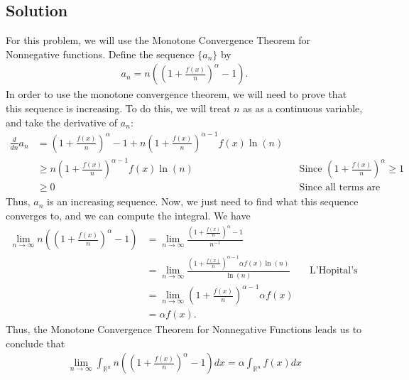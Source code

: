 \documentclass[10pt,a4paper]{article}
\theoremstyle{theorem}
\theoremstyle{definition}
\begin{document}
\subsection*{Solution}
For this problem, we will use the Monotone Convergence Theorem for Nonnegative functions. Define the sequence $\{a_n \}$ by
\begin{align*}
a_n = n \left( \left( 1 + \frac{f(x)}{n} \right)^ \alpha - 1 \right).
\end{align*}
In order to use the monotone convergence theorem, we will need to prove that this sequence is increasing. To do this, we will treat $n$ as as a continuous variable, and take the derivative of $a_n$:
\begin{align*}
\frac{d}{dn}a_n &= \left( 1 + \frac{f(x)}{n} \right)^ \alpha - 1 + n\left( 1 + \frac{f(x)}{n} \right)^ {\alpha - 1} f(x) \ln(n)\\
&\geq n\left( 1 + \frac{f(x)}{n} \right)^ {\alpha - 1} f(x) \ln(n) && \text{Since } \left( 1 + \frac{f(x)}{n} \right)^ \alpha \geq 1\\
&\geq 0 &&\text{Since all terms are nonnegative}
\end{align*}
Thus, $a_n$ is an increasing sequence. Now, we just need to find what this sequence converges to, and we can compute the integral. We have
\begin{align*}
\lim_{n \to \infty} n \left( \left( 1 + \frac{f(x)}{n} \right)^ \alpha - 1 \right) &= \lim_{n \to \infty} \frac{\left( 1 + \frac{f(x)}{n} \right)^ \alpha - 1}{n^{-1}}\\
&= \lim_{n \to \infty} \frac{\left( 1 + \frac{f(x)}{n} \right)^{ \alpha - 1} \alpha f(x) \ln(n)}{\ln(n)} &&\text{L'Hopital's Rule}\\
&=  \lim_{n \to \infty} \left( 1 + \frac{f(x)}{n} \right)^{ \alpha - 1} \alpha f(x)\\
&= \alpha f(x).
\end{align*}
Thus, the Monotone Convergence Theorem for Nonnegative Functions leads us to conclude that
\begin{align*}
\lim_{n \to \infty} \int_{\mathbb{R}^n} n \left( \left( 1 + \frac{f(x)}{n} \right)^ \alpha - 1 \right) dx = \alpha \int_{\mathbb{R}^n} f(x)dx
\end{align*}
\end{document}
